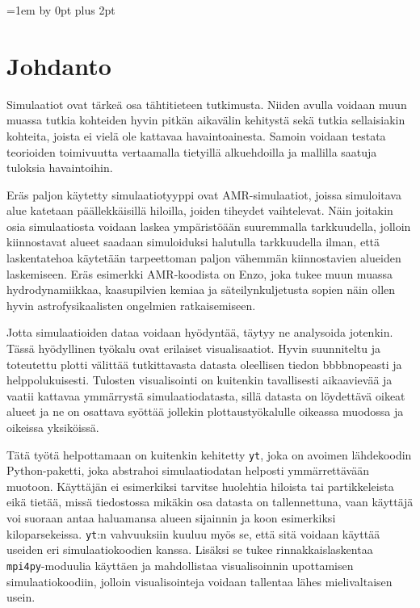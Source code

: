 \documentclass[12pt,a4paper]{article}
\newcommand{\yt}{\texttt{yt}}
\begin{document}


\newpage
\tableofcontents
\thispagestyle{empty}
\newpage
\setcounter{page}{1}
\parskip=1em \advance\parskip by 0pt plus 2pt
\pagestyle{fancy}
\cfoot{\thepage}

\section{Johdanto}
Simulaatiot ovat tärkeä osa tähtitieteen tutkimusta. Niiden avulla voidaan muun muassa tutkia kohteiden hyvin pitkän aikavälin kehitystä sekä tutkia sellaisiakin kohteita, joista ei vielä ole kattavaa havaintoainesta. Samoin voidaan testata teorioiden toimivuutta vertaamalla tietyillä alkuehdoilla ja mallilla saatuja tuloksia havaintoihin.

Eräs paljon käytetty simulaatiotyyppi ovat AMR-simulaatiot, joissa simuloitava alue katetaan päällekkäisillä hiloilla, joiden tiheydet vaihtelevat. Näin joitakin osia simulaatiosta voidaan laskea ympäristöään suuremmalla tarkkuudella, jolloin kiinnostavat alueet saadaan simuloiduksi halutulla tarkkuudella ilman, että laskentatehoa käytetään tarpeettoman paljon vähemmän kiinnostavien alueiden laskemiseen. Eräs esimerkki AMR-koodista on Enzo, joka tukee muun muassa hydrodynamiikkaa, kaasupilvien kemiaa ja säteilynkuljetusta sopien näin ollen hyvin astrofysikaalisten ongelmien ratkaisemiseen. \cite{enzo}

Jotta simulaatioiden dataa voidaan hyödyntää, täytyy ne analysoida jotenkin. Tässä hyö\-dyl\-li\-nen työkalu ovat erilaiset visualisaatiot. Hyvin suunniteltu ja toteutettu plotti välittää tutkittavasta datasta oleellisen tiedon bbbbnopeasti ja helppolukuisesti. Tulosten visualisointi on kuitenkin tavallisesti aikaavievää ja vaatii kattavaa ymmärrystä simulaatiodatasta, sillä datasta on löydettävä oikeat alueet ja ne on osattava syöttää jollekin plottaustyökalulle oikeassa muodossa ja oikeissa yksiköissä.

Tätä työtä helpottamaan on kuitenkin kehitetty \yt, joka on avoimen lähdekoodin Python-paketti, joka abstrahoi simulaatiodatan helposti ymmärrettävään muotoon. Käyttäjän ei esimerkiksi tarvitse huolehtia hiloista tai partikkeleista eikä tietää, missä tiedostossa mikäkin osa datasta on tallennettuna, vaan käyttäjä voi suoraan antaa haluamansa alueen sijainnin ja koon esimerkiksi kiloparsekeissa. \yt :n vahvuuksiin kuuluu myös se, että sitä voidaan käyttää useiden eri simulaatiokoodien kanssa. Lisäksi se tukee rinnakkaislaskentaa \texttt{mpi4py}-moduulia käyttäen ja mahdollistaa visualisoinnin upottamisen simulaatiokoodiin, jolloin visualisointeja voidaan tallentaa lähes mielivaltaisen usein. \cite{yt}
\end{document}
